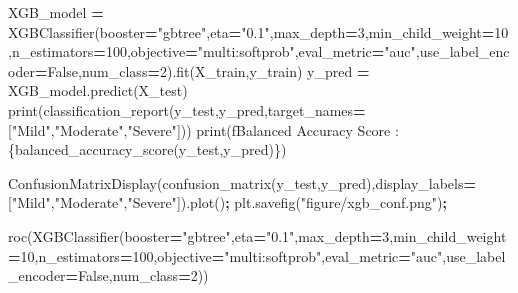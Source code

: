 \documentclass[12pt,twoside]{deuthesis}
\newenvironment{Shaded}{\begin{snugshade}}{\end{snugshade}}
\newcommand{\BuiltInTok}[1]{#1}
\newcommand{\DecValTok}[1]{\textcolor[rgb]{0.00,0.00,0.81}{#1}}
\newcommand{\NormalTok}[1]{#1}
\newcommand{\OperatorTok}[1]{\textcolor[rgb]{0.81,0.36,0.00}{\textbf{#1}}}
\newcommand{\SpecialCharTok}[1]{\textcolor[rgb]{0.00,0.00,0.00}{#1}}
\newcommand{\SpecialStringTok}[1]{\textcolor[rgb]{0.31,0.60,0.02}{#1}}
\newcommand{\StringTok}[1]{\textcolor[rgb]{0.31,0.60,0.02}{#1}}
\newcommand{\VariableTok}[1]{\textcolor[rgb]{0.00,0.00,0.00}{#1}}
\begin{document}
\begin{Shaded}
\begin{Highlighting}[]
\NormalTok{XGB\_model }\OperatorTok{=}\NormalTok{ XGBClassifier(booster}\OperatorTok{=}\StringTok{"gbtree"}\NormalTok{,eta}\OperatorTok{=}\StringTok{"0.1"}\NormalTok{,max\_depth}\OperatorTok{=}\DecValTok{3}\NormalTok{,min\_child\_weight}\OperatorTok{=}\DecValTok{10}\NormalTok{,n\_estimators}\OperatorTok{=}\DecValTok{100}\NormalTok{,objective}\OperatorTok{=}\StringTok{"multi:softprob"}\NormalTok{,eval\_metric}\OperatorTok{=}\StringTok{"auc"}\NormalTok{,use\_label\_encoder}\OperatorTok{=}\VariableTok{False}\NormalTok{,num\_class}\OperatorTok{=}\DecValTok{2}\NormalTok{).fit(X\_train,y\_train)}
\NormalTok{y\_pred }\OperatorTok{=}\NormalTok{ XGB\_model.predict(X\_test)}
\BuiltInTok{print}\NormalTok{(classification\_report(y\_test,y\_pred,target\_names}\OperatorTok{=}\NormalTok{[}\StringTok{"Mild"}\NormalTok{,}\StringTok{"Moderate"}\NormalTok{,}\StringTok{"Severe"}\NormalTok{]))}
\BuiltInTok{print}\NormalTok{(}\SpecialStringTok{f\textquotesingle{}Balanced Accuracy Score : }\SpecialCharTok{\{}\NormalTok{balanced\_accuracy\_score(y\_test,y\_pred)}\SpecialCharTok{\}}\SpecialStringTok{\textquotesingle{}}\NormalTok{)}
\end{Highlighting}
\end{Shaded}
\begin{Shaded}
\begin{Highlighting}[]
\NormalTok{ConfusionMatrixDisplay(confusion\_matrix(y\_test,y\_pred),display\_labels}\OperatorTok{=}\NormalTok{[}\StringTok{"Mild"}\NormalTok{,}\StringTok{"Moderate"}\NormalTok{,}\StringTok{"Severe"}\NormalTok{]).plot()}\OperatorTok{;}
\NormalTok{plt.savefig(}\StringTok{"figure/xgb\_conf.png"}\NormalTok{)}\OperatorTok{;}
\end{Highlighting}
\end{Shaded}
\begin{Shaded}
\begin{Highlighting}[]
\NormalTok{roc(XGBClassifier(booster}\OperatorTok{=}\StringTok{"gbtree"}\NormalTok{,eta}\OperatorTok{=}\StringTok{"0.1"}\NormalTok{,max\_depth}\OperatorTok{=}\DecValTok{3}\NormalTok{,min\_child\_weight}\OperatorTok{=}\DecValTok{10}\NormalTok{,n\_estimators}\OperatorTok{=}\DecValTok{100}\NormalTok{,objective}\OperatorTok{=}\StringTok{"multi:softprob"}\NormalTok{,eval\_metric}\OperatorTok{=}\StringTok{"auc"}\NormalTok{,use\_label\_encoder}\OperatorTok{=}\VariableTok{False}\NormalTok{,num\_class}\OperatorTok{=}\DecValTok{2}\NormalTok{))}
\end{Highlighting}
\end{Shaded}
\end{document}
